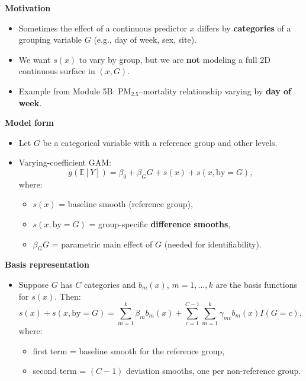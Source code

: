 \documentclass[
  letterpaper,
  DIV=11,
  numbers=noendperiod]{scrreprt}
\providecommand{\tightlist}{%
  \setlength{\itemsep}{0pt}\setlength{\parskip}{0pt}}\usepackage{longtable,booktabs,array}
\begin{document}
\markright{\textcolor{purple}{5. Varying-Coefficient Smooths (Effect Modification, Module 5B)}}

\textbf{Motivation}

\begin{itemize}
\tightlist
\item
  Sometimes the effect of a continuous predictor \(x\) differs by
  \textbf{categories} of a grouping variable \(G\) (e.g., day of week,
  sex, site).
\item
  We want \(s(x)\) to vary by group, but we are \textbf{not} modeling a
  full 2D continuous surface in \((x,G)\).
\item
  Example from Module 5B: PM\(_{2.5}\)--mortality relationship varying
  by \textbf{day of week}.
\end{itemize}

\textbf{Model form}

\begin{itemize}
\tightlist
\item
  Let \(G\) be a categorical variable with a reference group and other
  levels.
\item
  Varying-coefficient GAM: \[
  g(\mathbb{E}[Y]) =
  \beta_0 + \beta_G G
  + s(x) + s(x,\text{by}=G),
  \] where:

  \begin{itemize}
  \tightlist
  \item
    \(s(x)\) = baseline smooth (reference group),
  \item
    \(s(x,\text{by}=G)\) = group-specific \textbf{difference smooths},
  \item
    \(\beta_G G\) = parametric main effect of \(G\) (needed for
    identifiability).
  \end{itemize}
\end{itemize}

\textbf{Basis representation}

\begin{itemize}
\tightlist
\item
  Suppose \(G\) has \(C\) categories and \(b_m(x)\), \(m=1,\dots,k\) are
  the basis functions for \(s(x)\). Then: \[
  s(x) + s(x,\text{by}=G)
  = \sum_{m=1}^k \beta_m b_m(x)
  + \sum_{c=1}^{C-1} \sum_{m=1}^k \gamma_{mc} b_m(x) I(G = c),
  \] where:

  \begin{itemize}
  \tightlist
  \item
    first term = baseline smooth for the reference group,
  \item
    second term = \((C-1)\) deviation smooths, one per non-reference
    group.
  \end{itemize}
\end{itemize}
\end{document}
